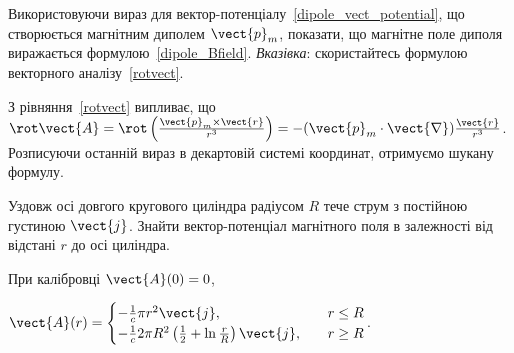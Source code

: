 \begin{problem}
Використовуючи вираз для вектор-потенціалу~\eqref{dipole_vect_potential}, що створюється магнітним диполем $\vect{p}_m$, показати, що магнітне поле диполя виражається формулою~\eqref{dipole_Bfield}.
\emph{Вказівка}: скористайтесь формулою векторного аналізу~\eqref{rotvect}.
\begin{solution}
	З рівняння~\eqref{rotvect} випливає, що $\rot\vect{A} = \rot\left( \frac{\vect{p}_m\times\vect{r}}{r^3}\right)  = -(\vect{p}_m\cdot\vect{\nabla}) \frac{\vect{r}}{r^3}$.
	Розписуючи останній вираз  в декартовій системі координат, отримуємо шукану формулу.
\end{solution}
\end{problem}


\begin{problem}
Уздовж осі довгого кругового циліндра радіусом $R$ тече струм з постійною густиною $\vect{j}$. Знайти вектор-потенціал магнітного поля в залежності від відстані $r$ до осі циліндра.
\begin{solution}
	При калібровці $\vect{A}(0) = 0$,

	$
		\vect{A}(r) = %
		\begin{cases}
			-\frac{1}{c}\pi r^2\vect{j},                                          & \quad r \le R \\
			-\frac{1}{c}2\pi R^2\left( \frac12 + \ln\frac{r}{R}\right) \vect{j} , & \quad r \ge R
		\end{cases}
	$.
\end{solution}
\end{problem}


